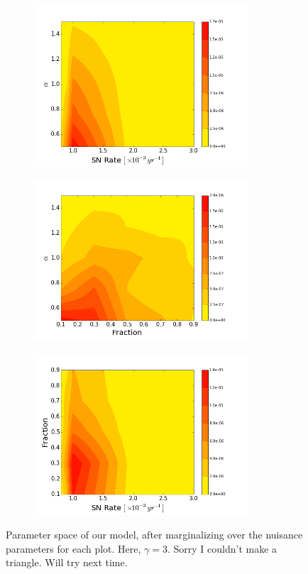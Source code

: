 \documentclass[10pt,a4paper]{article}
\begin{document}
\begin{figure}[h!]
	\begin{subfigure}[b]{0.5\textwidth}
		\includegraphics[width=8cm]{AlphaRate.png}
		\caption{}
	\end{subfigure}
	\begin{subfigure}[b]{0.5\textwidth}
		\includegraphics[width=8cm]{AlphaFraction.png}
		\caption{}
	\end{subfigure}
	\begin{subfigure}[b]{0.5\textwidth}
		\includegraphics[width=8cm]{FractionRate.png}
		\caption{}
	\end{subfigure}
	\caption{Parameter space of our model, after marginalizing over the nuisance parameters for each plot. Here, $\gamma = 3$. Sorry I couldn't make a triangle. Will try next time.}
\end{figure}
\newpage
\end{document}
